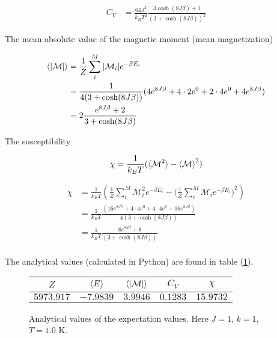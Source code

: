 \documentclass[11pt]{article}
\begin{document}
\begin{flushleft}
\begin{align*}
C_V &= \frac{64J^2}{k_B T^2}
\frac{3\cosh (8J \beta) + 1}{ (3 + \cosh (8 J \beta))^2}
\end{align*}


The mean absolute value of the magnetic moment (mean magnetization)

\begin{align*}
\braket{|\mathcal{M}|} 
&= \frac{1}{Z} \sum_i^M |\mathcal{M}_i| e^{- \beta E_i}\\
&= \frac{1}{4(3 + \cosh (8 J \beta))} (4e^{8J \beta} + 4 \cdot 2 e^0 + 2 \cdot 4 e^0 +4 e^{8 J \beta})\\
& =2 \frac{e^{8J \beta} + 2 }{3 + \cosh (8 J \beta)} \\
\end{align*}



The susceptibility

\begin{equation}
\chi = \frac{1}{k_B T} (\braket{\mathcal{M}^2} - \braket{\mathcal{M}}^2)
\end{equation}

\begin{align*}
\chi &= \frac{1}{k_B T} (\frac{1}{Z} \sum_i^M \mathcal{M}_i^2 e^{- \beta E_i}- \Big(\frac{1}{Z} \sum_i^M \mathcal{M}_i e^{- \beta E_i}\Big)^2)\\
&= \frac{1}{k_B T} 
\frac{(16e^{8J \beta} + 4 \cdot 4 e^0 + 4 \cdot 4 e^0 + 16 e^{8J \beta})}{4(3 + \cosh (8 J \beta))} \\
&= \frac{1}{k_B T} 
\frac{8e^{8J \beta} +8}{(3 + \cosh (8 J \beta))} \\
\end{align*}

\end{flushleft}

\begin{flushleft}
The analytical values (calculated in Python) are found in table (\ref{fig:: analytical}).

\begin{figure}[h]
\label{fig:: analytical}
\centering
\begin{tabular}{|c|c|c|c|c|}
\hline
$Z$ &$\braket{E}$ & $\braket{|\mathcal{M}|}$ & $C_V$ & $\chi$\\
\hline
$5973.917$ & $-7.9839$ & $3.9946$ & $0.1283$ & $15.9732$\\
\hline
\end{tabular}
\caption{Analytical values of the expectation values. Here $J=1$, $k=1$, $T=1.0$ K.}
\end{figure}
\end{flushleft}
\end{document}
